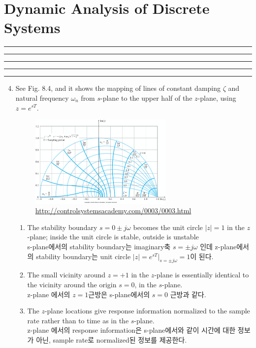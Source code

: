 \setcounter{chapter}{7}
\setcounter{section}{1}
\section{Dynamic Analysis of Discrete Systems}
\vspace{-8pt} \hrule \hrule \hrule \hrule \hrule  \vspace{12pt}
	\begin{enumerate}
		\setcounter{enumi}{3}
\item See Fig. 8.4, and it shows the mapping of lines of constant damping $\zeta$ and natural frequency $\omega_n$ from $s$-plane to the upper half of the $z$-plane, using $z = e^{sT}$. 

		\begin{figure}[h]
		    \centering
			\includegraphics[width=7cm]{./FIG_Franklin/fig8-4.png}\\
			\url{http://controlsystemsacademy.com/0003/0003.html}
		\end{figure}
		\begin{enumerate}
			\item The stability boundary $s= 0 \pm j\omega$ becomes the unit circle $|z| =1$ in the $z$-plane; inside the unit circle is stable, outside is unstable\\
			s-plane에서의 stability boundary는 imaginary축 $s = \pm j\omega$ 인데 z-plane에서의 stability boundary는 unit circle $|z|=e^{sT}|_{s=\pm j \omega }= 1 $이 된다.
			\item The small vicinity around $z=+1$ in the $z$-plane is essentially identical to the vicinity around the origin $s=0$, in the $s$-plane.\\
			z-plane 에서의 $z=1$근방은 s-plane에서의 $s=0$ 근방과 같다.
			\item The $z$-plane locations give response information normalized to the sample rate rather than to time as in the $s$-plane. \\
			z-plane 에서의 response information은 s-plane에서와 같이 시간에 대한 정보가 아닌, sample rate로 normalized된 정보를 제공한다.

\end{enumerate}
\end{enumerate}
